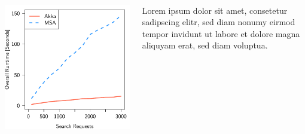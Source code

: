 \documentclass[final,hyperref={pdfpagelabels=true}]{beamer}
\begin{document}
\begin{frame}
\begin{columns}[t]
    \begin{column}{.45\textwidth}
      \textsf{\textbf{}} \\ %
      \vspace*{\baselineskip}
      \begin{columns}[t]
        \begin{column}{.45\textwidth}
          \includegraphics[width=1\textwidth]{graphics/eval-search-rtt-overall.pdf}
        \end{column}
        \begin{column}{.45\textwidth}
          {\lmodern
            Lorem ipsum dolor sit amet, consetetur sadipscing elitr, sed diam nonumy eirmod tempor invidunt ut labore et dolore magna aliquyam erat, sed diam voluptua.
          }
        \end{column}
      \end{columns}
    \end{column}
  \end{columns}


\end{frame}
\end{document}
